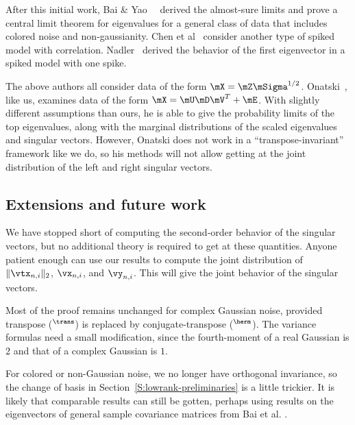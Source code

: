 After this initial work, Bai \& Yao~\cite{bai2008clt}~\cite{bai2008lts} derived the almost-sure limits and prove a central limit theorem for eigenvalues for a general class of data that includes colored noise and non-gaussianity.  Chen et al~\cite{chen2009ppc} consider another type of spiked model with correlation.  Nadler~\cite{nadler2008fsa} derived the behavior of the first eigenvector in a spiked model with one spike.

The above authors all consider data of the form $\mX = \mZ \mSigma^{1/2}$.
Onatski~\cite{onatski2009}, like us, examines data of the form 
$\mX = \mU \mD \mV^T + \mE$.  With slightly different assumptions than ours, he is able to give the probability limits of the top eigenvalues, along with the marginal distributions of the scaled eigenvalues and singular vectors.  However, Onatski does not work in a ``transpose-invariant'' framework like we do, so his methods will not allow getting at the joint distribution of the left and right singular vectors.

\subsection{Extensions and future work}

We have stopped short of computing the second-order behavior of the singular vectors, but no additional theory is required to get at these quantities.  Anyone patient enough can use our results to compute the joint distribution of 
$\| \vtx_{n,i} \|_2$, $\vx_{n,i}$, and $\vy_{n,i}$.  This will give the joint behavior of the singular vectors.  

Most of the proof remains unchanged for complex Gaussian noise, provided
transpose ($^\trans$) is replaced by conjugate-transpose ($^\herm$).  The
variance formulas need a small modification, since the fourth-moment of
a real Gaussian is $2$ and that of a complex Gaussian is $1$.

For colored or non-Gaussian noise, we no longer have orthogonal invariance, so the change of basis in Section~\ref{S:lowrank-preliminaries} is a little trickier.  It is likely that comparable results can still be gotten, perhaps using results on the eigenvectors of general sample covariance matrices from Bai et al. \cite{bai2007ael}.

